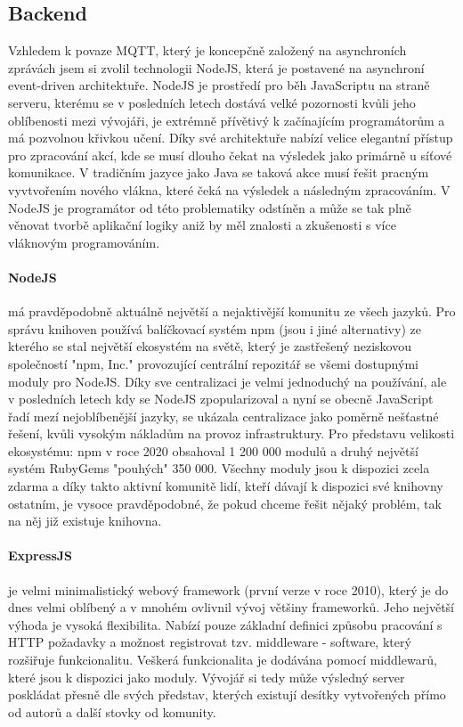 \subsection{Backend}    %
Vzhledem k povaze MQTT, který je koncepčně založený na asynchroních zprávách jsem si zvolil technologii NodeJS, která je postavené na asynchroní event-driven architektuře. NodeJS je prostředí pro běh JavaScriptu na straně serveru, kterému se v posledních letech dostává velké pozornosti kvůli jeho oblíbenosti mezi vývojáři, je extrémně přívětivý k začínajícím programátorům a má pozvolnou křivkou učení. Díky své architektuře nabízí velice elegantní přístup pro zpracování akcí, kde se musí dlouho čekat na výsledek jako primárně u síťové komunikace. V tradičním jazyce jako Java se taková akce musí řešit pracným vyvtvořením nového vlákna, které čeká na výsledek a následným zpracováním. V NodeJS je programátor od této problematiky odstíněn a může se tak plně věnovat tvorbě aplikační logiky aniž by měl znalosti a zkušenosti s více vláknovým programováním.

\paragraph{NodeJS} má pravděpodobně aktuálně největší a nejaktivější komunitu ze všech jazyků. Pro správu knihoven používá balíčkovací systém npm (jsou i jiné alternativy) ze kterého se stal největší ekosystém na světě, který je zastřešený neziskovou společností "npm, Inc." provozující centrální repozitář se všemi dostupnými moduly pro NodeJS. Díky sve centralizaci je velmi jednoduchý na používání, ale v posledních letech kdy se NodeJS zpopularizoval a nyní se obecně JavaScript řadí mezí nejoblíbenější jazyky, se ukázala centralizace jako poměrně nešťastné řešení, kvůli vysokým nákladům na provoz infrastruktury. Pro představu velikosti ekosystému: npm v roce 2020 obsahoval 1 200 000 modulů a druhý největší systém RubyGems "pouhých" 350 000. Všechny moduly jsou k dispozici zcela zdarma a díky takto aktivní komunitě lidí, kteří dávají k dispozici své knihovny ostatním, je vysoce pravděpodobné, že pokud chceme řešit nějaký problém, tak na něj již existuje knihovna.

\paragraph{ExpressJS} je velmi minimalistický webový framework (první verze v roce 2010), který je do dnes velmi oblíbený a v mnohém ovlivnil vývoj většiny frameworků. Jeho největší výhoda je vysoká flexibilita. Nabízí pouze základní definici způsobu pracování s HTTP požadavky a možnost registrovat tzv. middleware - software, který rozšiřuje funkcionalitu. Veškerá funkcionalita je dodávána pomocí middlewarů, které jsou k dispozici jako moduly. Vývojář si tedy může výsledný server poskládat přesně dle svých představ, kterých existují desítky vytvořených přímo od autorů a další stovky od komunity.

